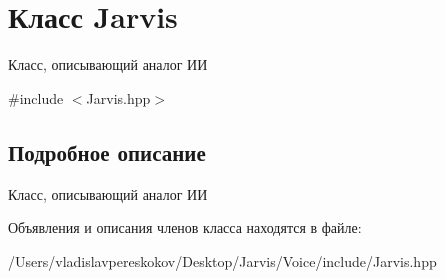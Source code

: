 \hypertarget{classJarvis}{}\section{Класс Jarvis}
\label{classJarvis}


Класс, описывающий аналог ИИ  




{\ttfamily \#include $<$Jarvis.\+hpp$>$}



\subsection{Подробное описание}
Класс, описывающий аналог ИИ 

Объявления и описания членов класса находятся в файле\+:\begin{DoxyCompactItemize}
\item 
/\+Users/vladislavpereskokov/\+Desktop/\+Jarvis/\+Voice/include/Jarvis.\+hpp\end{DoxyCompactItemize}
